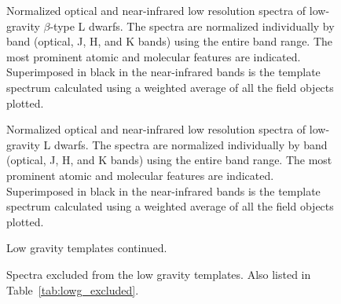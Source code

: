 \documentclass[12pt,preprint]{aastex}
\begin{document}
\begin{figure}
	\caption{Normalized optical and near-infrared low resolution spectra of low-gravity $\beta$-type L
dwarfs. The spectra are normalized individually by band (optical, J, H, and K bands)
using the entire band range. The most prominent atomic and molecular features are indicated. Superimposed in black in the near-infrared
bands is the template spectrum calculated using a weighted average of all the
field objects plotted.}
	\label{fig:beta_templates}
\end{figure}

\begin{figure}
	\caption{Normalized optical and near-infrared low resolution spectra of low-gravity L
dwarfs. The spectra are normalized individually by band (optical, J, H, and K bands)
using the entire band range. The most prominent atomic and molecular features are indicated. Superimposed in black in the near-infrared
bands is the template spectrum calculated using a weighted average of all the
field objects plotted.}
	\label{fig:gamma_templates}
\end{figure}

\begin{figure}
	\caption{Low gravity templates continued.}
\end{figure}


\begin{figure}
	\caption{Spectra excluded from the low gravity templates. Also listed in Table~\ref{tab:lowg_excluded}.}
	\label{fig:lowg_excluded}
\end{figure}
\begin{figure}
	
\end{figure}
\end{document}
